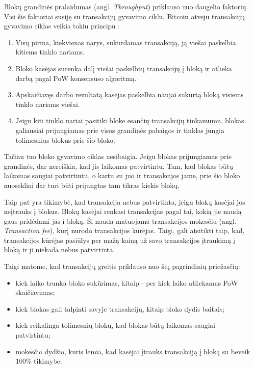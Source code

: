 
Blokų grandinės pralaidumas (angl. \textit{Throughput}) priklauso nuo daugelio faktorių. Visi šie faktoriai susiję su transakcijų gyvavimo ciklu. Bitcoin atveju transakcijų gyvavimo ciklas veikia tokiu principu \cite{nakamoto2008bitcoin}:
\begin{enumerate}
    \item Visų pirma, kiekvienas narys, sukurdamas transakciją, ją viešai paskelbia kitiems tinklo nariams. 
    \item Bloko kasėjas surenka dalį viešai paskelbtų transakcijų į bloką ir atlieka darbą pagal PoW konsensuso algoritmą.
    \item Apskaičiavęs darbo rezultatą kasėjas paskelbia naujai sukurtą bloką visiems tinklo nariams viešai. 
    \item Jeigu kiti tinklo nariai pasitiki bloke esančių transakcijų tinkamumu, blokas galiausiai prijungiamas prie visos grandinės pabaigos ir tinklas jungia tolimesnius blokus prie šio bloko. 
\end{enumerate}

Tačiau tuo bloko gyvavimo ciklas nesibaigia. Jeigu blokas prijungiamas prie grandinės, dar nereiškia, kad jis laikomas patvirtintu. Tam, kad blokas būtų laikomas saugiai patvirtintu, o kartu su juo ir transakcijos jame, prie šio bloko nuosekliai dar turi būti prijungtas tam tikras kiekis blokų. 

Taip pat yra tikimybė, kad transakcija nebus patvirtinta, jeigu blokų kasėjai jos neįtrauks į blokus. Blokų kasėjai renkasi transakcijas pagal tai, kokią jie naudą gaus pridėdami jas į bloką. Ši nauda matuojama transakcijos mokesčiu (angl. \textit{Transaction fee}), kurį nurodo transakcijos kūrėjas. Taigi, gali atsitikti taip, kad, transakcijos kūrėjas pasiūlys per mažą kainą už savo transakcijos įtraukimą į bloką ir ji niekada nebus patvirtinta.

Taigi matome, kad transakcijų greitis priklauso nuo šių pagrindinių priežasčių: 
\begin{itemize}
    \item kiek laiko trunka bloko sukūrimas, kitaip - per kiek laiko atliekamas PoW skaičiavimas;
    \item kiek blokas gali talpinti savyje transakcijų, kitaip bloko dydis baitais;
    \item kiek reikalinga tolimesnių blokų, kad blokas būtų laikomas saugiai patvirtintu;
    \item mokesčio dydžio, kuris lemia, kad kasėjai įtrauks transakciją į bloką su beveik 100\% tikimybe.
\end{itemize} 

